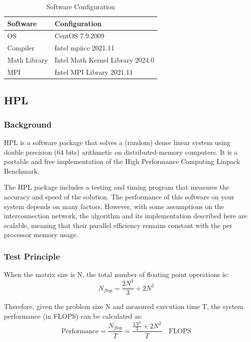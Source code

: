\documentclass[a4paper,12pt]{article}
\begin{document}
\begin{table}[H]
\centering
\vspace{0.5cm}
\begin{tabular}{ll}
\toprule
Software & Configuration \\
\midrule
OS & CentOS 7.9.2009 \\
Compiler & Intel mpiicc 2021.11 \\
Math Library & Intel Math Kernel Library 2024.0 \\
MPI & Intel MPI Library 2021.11 \\
\bottomrule
\end{tabular}
\caption{Software Configuration}
\end{table}

\subsection{HPL}

\subsubsection{Background}

HPL is a software package that solves a (random) dense linear system using double precision (64 bits) arithmetic on distributed-memory computers. It is a portable and free implementation of the High Performance Computing Linpack Benchmark.

The HPL package includes a testing and timing program that measures the accuracy and speed of the solution. The performance of this software on your system depends on many factors. However, with some assumptions on the interconnection network, the algorithm and its implementation described here are scalable, meaning that their parallel efficiency remains constant with the per processor memory usage.

\subsubsection{Test Principle}

When the matrix size is N, the total number of floating point operations is:
\begin{equation}
    N_{flop} = \frac{2N^3}{3} + 2N^2
\end{equation}

Therefore, given the problem size N and measured execution time T, the system performance (in FLOPS) can be calculated as:
\begin{equation}
    \text{Performance} = \frac{N_{flop}}{T} = \frac{\frac{2N^3}{3} + 2N^2}{T} \quad \text{FLOPS}
\end{equation}
\end{document}
